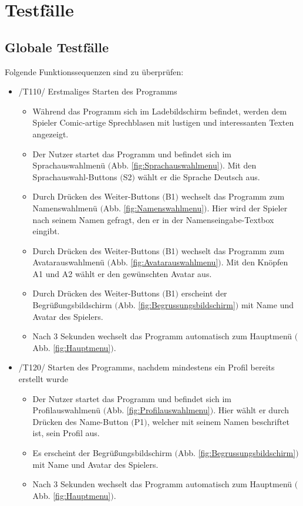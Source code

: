 \section{Testfälle}

\subsection{Globale Testfälle}
Folgende Funktionssequenzen sind zu überprüfen:

\begin{itemize}
\item /T110/ Erstmaliges Starten des Programms
\begin{itemize}
\item Während das Programm sich im Ladebildschirm befindet, werden dem Spieler Comic-artige Sprechblasen mit lustigen und interessanten Texten angezeigt.
\item Der Nutzer startet das Programm und befindet sich im Sprachauswahlmenü $($Abb. \ref{fig:Sprachauswahlmenu}$)$. Mit den Sprachauswahl-Buttons $($S2$)$ wählt er die Sprache Deutsch aus.
\item Durch Drücken des Weiter-Buttons $($B1$)$ wechselt das Programm zum Namenswahlmenü $($Abb. \ref{fig:Namenswahlmenu}$)$. Hier wird der Spieler nach seinem Namen gefragt, den er in der Namenseingabe-Textbox eingibt.
\item Durch Drücken des  Weiter-Buttons $($B1$)$ wechselt das Programm zum Avatarauswahlmenü $($Abb. \ref{fig:Avatarauswahlmenu}$)$.
 Mit den Knöpfen A1 und A2 wählt er den gewünschten Avatar aus.
\item Durch Drücken des Weiter-Buttons $($B1$)$ erscheint der Begrüßungsbildschirm $($Abb. \ref{fig:Begrussungsbildschirm}$)$ mit Name und Avatar des Spielers.
\item Nach 3 Sekunden wechselt das Programm automatisch zum Hauptmenü $($Abb. \ref{fig:Hauptmenu}$)$.
\end{itemize}

\item /T120/ Starten des Programms, nachdem mindestens ein Profil bereits erstellt wurde
\begin{itemize}
\item Der Nutzer startet das Programm und befindet sich im Profilauswahlmenü $($Abb. \ref{fig:Profilauswahlmenu}$)$. Hier wählt er durch Drücken des Name-Button $($P1$)$, welcher mit seinem Namen beschriftet ist, sein Profil aus.
\item Es erscheint der Begrüßungsbildschirm $($Abb. \ref{fig:Begrussungsbildschirm}$)$ mit Name und Avatar des Spielers.
\item Nach 3 Sekunden wechselt das Programm automatisch zum Hauptmenü $($Abb. \ref{fig:Hauptmenu}$)$.
\end{itemize}


\end{itemize}
